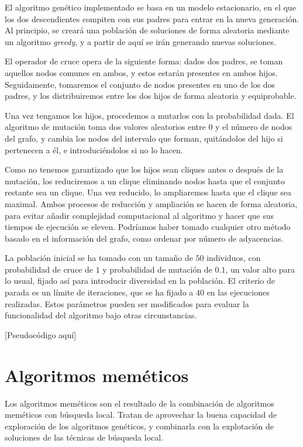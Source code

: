 El algoritmo genético implementado se basa en un modelo estacionario, en el que
los dos descendientes compiten con sus padres para entrar en la nueva generación.
Al principio, se creará una población de soluciones de forma aleatoria mediante
un algoritmo \textit{greedy}, y a partir de aquí se irán generando nuevas soluciones.

El operador de cruce opera de la siguiente forma: dados dos padres, se toman aquellos
nodos comunes en ambos, y estos estarán presentes en ambos hijos. Seguidamente,
tomaremos el conjunto de nodos presentes en uno de los dos padres, y los distribuiremos
entre los dos hijos de forma aleatoria y equiprobable.

Una vez tengamos los hijos, procedemos a mutarlos con la probabilidad dada. El
algoritmo de mutación toma dos valores aleatorios entre $0$ y el número de nodos
del grafo, y cambia los nodos del intervalo que forman, quitándolos del hijo si
pertenecen a él, e introduciéndolos si no lo hacen.

Como no tenemos garantizado que los hijos sean cliques antes o después de la mutación,
los reduciremos a un clique eliminando nodos hasta que el conjunto restante sea un
clique. Una vez reducido, lo ampliaremos hasta que el clique sea maximal.
Ambos procesos de reducción y ampliación se hacen de forma aleatoria, para evitar
añadir complejidad computacional al algoritmo y hacer que sus tiempos de ejecución
se eleven. Podríamos haber tomado cualquier otro método basado en el información del
grafo, como ordenar por número de adyacencias.

La población inicial se ha tomado con un tamaño de $50$ individuos, con probabilidad
de cruce de $1$ y probabilidad de mutación de $0.1$, un valor alto para lo usual,
fijado así para introducir diversidad en la población. El criterio de parada es un
límite de iteraciones, que se ha fijado a $40$ en las ejecuciones realizadas.
Estos parámetros pueden ser modificados para evaluar la funcionalidad del algoritmo
bajo otras circunstancias.

[Pseudocódigo aquí]

\section{Algoritmos meméticos}

Los algoritmos meméticos son el resultado de la combinación de algoritmos meméticos
con búsqueda local. Tratan de aprovechar la buena capacidad de exploración de los
algoritmos genéticos, y combinarla con la explotación de soluciones de las técnicas
de búsqueda local.

